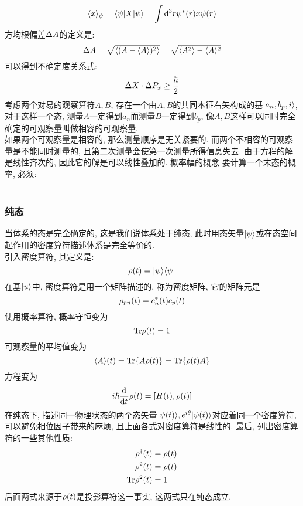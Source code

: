 \documentclass[UTF8]{ctexart}
\begin{document}
$$\langle {x} \rangle_\psi=\langle {\psi|X|\psi} \rangle=\int\mathop{}\!\mathrm{d}^3r \psi^*(r)x\psi(r)$$
方均根偏差$\Delta A$的定义是: 
$$\Delta A=\sqrt{\langle {(A-\langle {A} \rangle)^2} \rangle}=\sqrt{\langle {A^2} \rangle-\langle {A} \rangle^2}$$
可以得到不确定度关系式:
$$\Delta X\cdot \Delta P_x \geq \frac{\hbar}{2}$$
考虑两个对易的观察算符$A,B$, 存在一个由$A,B$的共同本征右矢构成的基$| {a_n,b_p,i} \rangle$, 对于这样一个态, 测量$A$一定得到$a_n$而测量$B$一定得到$b_p$, 像$A,B$这样可以同时完全确定的可观察量叫做相容的可观察量. \\
如果两个可观察量是相容的, 那么测量顺序是无关紧要的. 而两个不相容的可观察量是不能同时测量的, 且第二次测量会使第一次测量所得信息失去. 
由于\sch 方程的解是线性齐次的, 因此它的解是可以线性叠加的. 
概率幅的概念
要计算一个末态的概率, 必须:\\ \\
\subsubsection{纯态}
当体系的态是完全确定的, 这是我们说体系处于纯态, 此时用态矢量$| {\psi} \rangle$或在态空间起作用的密度算符描述体系是完全等价的. \\
引入密度算符, 其定义是:
$$\rho(t)=| {\psi} \rangle\langle {\psi} |$$
在基$| {u} \rangle$中, 密度算符是用一个矩阵描述的, 称为密度矩阵, 它的矩阵元是
$$\rho_{pn}(t)=c_n^*(t)c_p(t)$$
使用概率算符, 概率守恒变为
$$\mathop{}\!\mathrm{Tr}\rho(t)=1$$
可观察量的平均值变为
$$\langle {A} \rangle(t)=\mathop{}\!\mathrm{Tr}\{A\rho(t)\}=\mathop{}\!\mathrm{Tr}\{\rho(t)A\}$$
\sch 方程变为
$$i\hbar\frac{\mathrm{d}^{} }{\mathrm{d} t^{}}\rho(t)=[H(t),\rho(t)]$$
在纯态下, 描述同一物理状态的两个态矢量$| {\psi(t)} \rangle,e^{i\theta}| {\psi(t)} \rangle$对应着同一个密度算符, 可以避免相位因子带来的麻烦, 且上面各式对密度算符是线性的. 最后, 列出密度算符的一些其他性质:
$$\begin{aligned} 
    \rho^{\dagger}(t)&=\rho(t)\\
    \rho^2(t)&=\rho(t)\\
    \mathop{}\!\mathrm{Tr}\rho^2(t)&=1
 \end{aligned}$$
后面两式来源于$\rho(t)$是投影算符这一事实, 这两式只在纯态成立.
\end{document}
